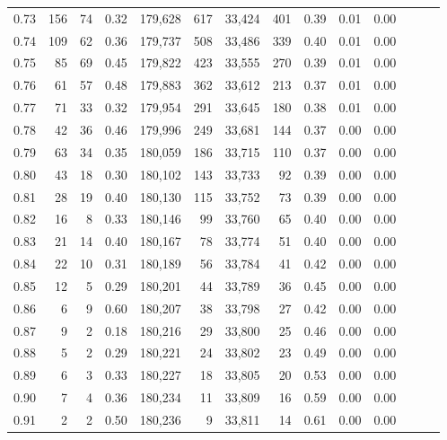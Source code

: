 \begin{tabular}{rrrrrrrrrrrrrr}
0.73 &    156 &     74 &  0.32 &  179,628 &      617 &  33,424 &     401 &  0.39 &  0.01 &      0.00 \\
0.74 &    109 &     62 &  0.36 &  179,737 &      508 &  33,486 &     339 &  0.40 &  0.01 &      0.00 \\
0.75 &     85 &     69 &  0.45 &  179,822 &      423 &  33,555 &     270 &  0.39 &  0.01 &      0.00 \\
0.76 &     61 &     57 &  0.48 &  179,883 &      362 &  33,612 &     213 &  0.37 &  0.01 &      0.00 \\
0.77 &     71 &     33 &  0.32 &  179,954 &      291 &  33,645 &     180 &  0.38 &  0.01 &      0.00 \\
0.78 &     42 &     36 &  0.46 &  179,996 &      249 &  33,681 &     144 &  0.37 &  0.00 &      0.00 \\
0.79 &     63 &     34 &  0.35 &  180,059 &      186 &  33,715 &     110 &  0.37 &  0.00 &      0.00 \\
0.80 &     43 &     18 &  0.30 &  180,102 &      143 &  33,733 &      92 &  0.39 &  0.00 &      0.00 \\
0.81 &     28 &     19 &  0.40 &  180,130 &      115 &  33,752 &      73 &  0.39 &  0.00 &      0.00 \\
0.82 &     16 &      8 &  0.33 &  180,146 &       99 &  33,760 &      65 &  0.40 &  0.00 &      0.00 \\
0.83 &     21 &     14 &  0.40 &  180,167 &       78 &  33,774 &      51 &  0.40 &  0.00 &      0.00 \\
0.84 &     22 &     10 &  0.31 &  180,189 &       56 &  33,784 &      41 &  0.42 &  0.00 &      0.00 \\
0.85 &     12 &      5 &  0.29 &  180,201 &       44 &  33,789 &      36 &  0.45 &  0.00 &      0.00 \\
0.86 &      6 &      9 &  0.60 &  180,207 &       38 &  33,798 &      27 &  0.42 &  0.00 &      0.00 \\
0.87 &      9 &      2 &  0.18 &  180,216 &       29 &  33,800 &      25 &  0.46 &  0.00 &      0.00 \\
0.88 &      5 &      2 &  0.29 &  180,221 &       24 &  33,802 &      23 &  0.49 &  0.00 &      0.00 \\
0.89 &      6 &      3 &  0.33 &  180,227 &       18 &  33,805 &      20 &  0.53 &  0.00 &      0.00 \\
0.90 &      7 &      4 &  0.36 &  180,234 &       11 &  33,809 &      16 &  0.59 &  0.00 &      0.00 \\
0.91 &      2 &      2 &  0.50 &  180,236 &        9 &  33,811 &      14 &  0.61 &  0.00 &      0.00 \\

\end{tabular}

